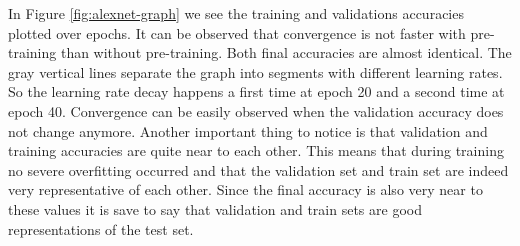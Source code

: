 \begin{table}[h] \centering
{}
\caption{Hyper parameters for Alexnet optimized with SigOpt and without pre-training}
\label{tbl:AlexNetBaseline}
\end{table}

\begin{table}[h] \centering
{}
\caption{Hyper parameters for Alexnet optimized with SigOpt and without pre-training}
\label{tbl:AlexNetMultiRun}
\end{table}

In Figure \ref{fig:alexnet-graph} we see the training and validations accuracies plotted over epochs. It can be observed that convergence is not faster with pre-training than without pre-training. Both final accuracies are almost identical. The gray vertical lines separate the graph into segments with different learning rates. So the learning rate decay happens a first time at epoch 20 and a second time at epoch 40. Convergence can be easily observed when the validation accuracy does not change anymore. Another important thing to notice is that validation and training accuracies are quite near to each other. This means that during training no severe overfitting occurred and that the validation set and train set are indeed very representative of each other. Since the final accuracy is also very near to these values it is save to say that validation and train sets are good representations of the test set.

